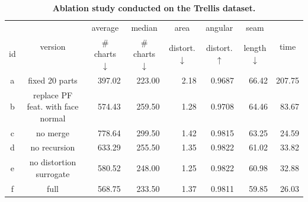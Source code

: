 \begin{table}[t]
  \centering
  \scriptsize
  \setlength{\tabcolsep}{1pt}
  \vspace{-1em}
  
  \caption{\textbf{Ablation study conducted on the Trellis dataset.}}
  \vspace{-2em}
    \begin{tabular}{c|c|rrrrrr}
    \toprule
   &  \multirow{2}[2]{*}{version} & \multicolumn{1}{c}{average} & \multicolumn{1}{c}{median} & \multicolumn{1}{c}{area} & \multicolumn{1}{c}{angular} & \multicolumn{1}{c}{seam} & \multicolumn{1}{c}{\multirow{2}[2]{*}{time }} \\
      id &    & \multicolumn{1}{c}{ \# charts $\downarrow$} & \multicolumn{1}{c}{ \# charts $\downarrow$} & \multicolumn{1}{c}{distort.$\downarrow$} & \multicolumn{1}{c}{distort.$\uparrow$} & \multicolumn{1}{c}{  length $\downarrow$} &  \\
    \midrule
    a & fixed 20 parts & 397.02 & 223.00 & 2.18  & 0.9687 & 66.42 & 207.75 \\
    b & replace PF feat. with face normal & 574.43 & 259.50 & 1.28  & 0.9708 & 64.46 & 83.67 \\
    c & no merge & 778.64 & 299.50 & 1.42  & 0.9815 & 63.25 & 24.59 \\
    d & no recursion & 633.29 & 255.50 & 1.35  & 0.9822 & 61.02 & 33.82 \\
    e & no distortion surrogate & 580.52 & 248.00 & 1.25  & 0.9822 & 60.98 & 32.88 \\
    f & full  & 568.75 & 233.50 & 1.37  & 0.9811 & 59.85 & 26.03 \\
    \bottomrule
    
    \end{tabular}%
    \vspace{-0.5em}
  \label{tab:ablation}%
\end{table}%
